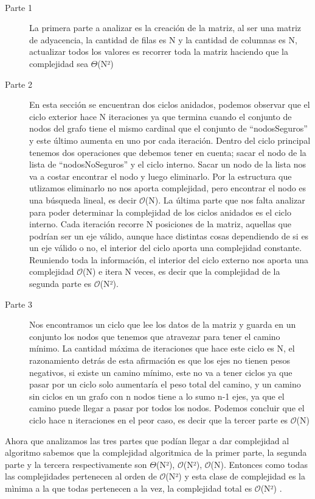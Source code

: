 \documentclass[spanish,12pt]{article}
\begin{document}
\\
\begin{description}
\item[Parte 1] La primera parte a analizar es la creación de la matriz, al ser una matriz de adyacencia, la cantidad de filas es N y la cantidad de columnas es N, actualizar todos los valores es recorrer toda la matriz haciendo que la complejidad sea $\Theta$(N²)
\\
\item[Parte 2] En esta sección se encuentran dos ciclos anidados, podemos observar que el ciclo exterior hace N iteraciones ya que termina cuando el conjunto de nodos del grafo tiene el mismo cardinal que el conjunto de ``nodosSeguros'' y este último aumenta en uno por cada iteración. Dentro del ciclo principal tenemos dos operaciones que debemos tener en cuenta; sacar el nodo de la lista de ``nodosNoSeguros'' y el ciclo interno. Sacar un nodo de la lista nos va a costar encontrar el nodo y luego eliminarlo. Por la estructura que utlizamos eliminarlo no nos aporta complejidad, pero encontrar el nodo es una búsqueda lineal, es decir $\mathcal{O}$(N). La última parte que nos falta analizar para poder determinar la complejidad de los ciclos anidados es el ciclo interno. Cada iteración recorre N posiciones de la matriz, aquellas que podrían ser un eje válido, aunque hace distintas cosas dependiendo de si es un eje válido o no, el interior del ciclo aporta una complejidad constante. Reuniendo toda la información, el interior del ciclo externo nos aporta una complejidad $\mathcal{O}$(N) e itera N veces, es decir que la complejidad de la segunda parte es $\mathcal{O}$(N²).
\\
\item[Parte 3] Nos encontramos un ciclo que lee los datos de la matriz y guarda en un conjunto los nodos que tenemos que atravezar para tener el camino mínimo. La cantidad máxima de iteraciones que hace este ciclo es N, el razonamiento detrás de esta afirmación es que los ejes no tienen pesos negativos, si existe un camino mínimo, este no va a tener ciclos ya que pasar por un ciclo solo aumentaría el peso total del camino, y un camino sin ciclos en un grafo con n nodos tiene a lo sumo n-1 ejes, ya que el camino puede llegar a pasar por todos los nodos. Podemos concluir que el ciclo hace n iteraciones en el peor caso, es decir que la tercer parte es $\mathcal{O}$(N)
\\
\end{description}
\tab Ahora que analizamos las tres partes que podían llegar a dar complejidad al algoritmo sabemos que la complejidad algoritmica de la primer parte, la segunda parte y la tercera respectivamente son $\Theta$(N²), $\mathcal{O}$(N²), $\mathcal{O}$(N). Entonces como todas las complejidades pertenecen al orden de $\mathcal{O}$(N²) y esta clase de complejidad es la mìnima a la que todas pertenecen a la vez, la complejidad total es $\mathcal{O}$(N²) .
\end{document}
